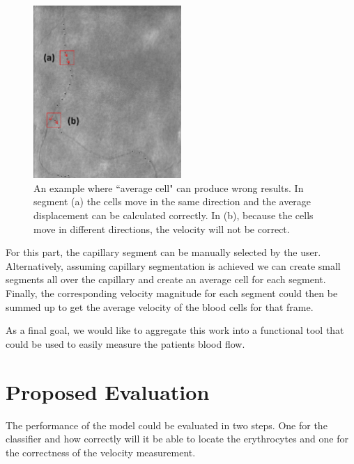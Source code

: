 \documentclass[]{article}
\begin{document}
\begin{figure}[ht]
	\centering
	\includegraphics[width=0.5\textwidth, scale=0.5 ]
	{segment-example.png}
	\caption{An example where ``average cell" can produce wrong results. In segment (a) the cells move in the same direction and the average displacement can be calculated correctly.
	In (b), because the cells move in different directions, the velocity will not be correct.}
	\label{fig:segment-fail-example}
\end{figure}
For this part, the capillary segment can be manually selected by the user. 
Alternatively, assuming capillary segmentation is achieved we can create small segments all over the capillary and create an average 
cell for each segment.
Finally, the corresponding velocity magnitude for each segment could then be summed up to get the average velocity of the blood cells for that frame.

As a final goal, we would like to aggregate this work into a functional
tool that could be used to easily measure the patients blood flow.

\section{Proposed Evaluation}

The performance of the model could be evaluated in two steps.
One for the classifier and how correctly will it be able to locate 
the erythrocytes and one for the correctness of the velocity measurement.
\end{document}
